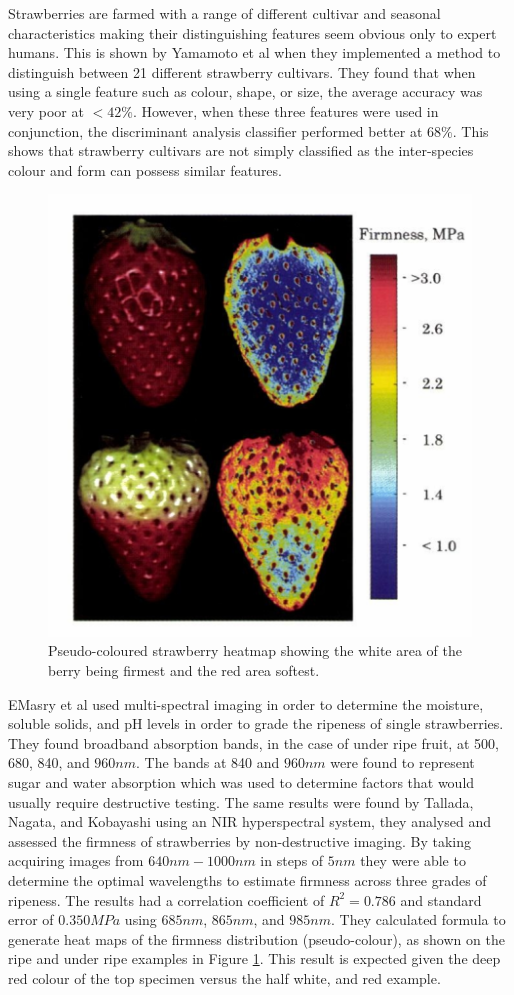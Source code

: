 \documentclass[fleqn,twoside,12pt]{report}
\begin{document}
Strawberries are farmed with a range of different cultivar and seasonal characteristics making their distinguishing features seem obvious only to expert humans. This is shown by Yamamoto et al \cite{yamamoto} when they implemented a method to distinguish between 21 different strawberry cultivars. They found that when using a single feature such as colour, shape, or size, the average accuracy was very poor at $<42\%$. However, when these three features were used in conjunction, the discriminant analysis classifier performed better at $68\%$. This shows that strawberry cultivars are not simply classified as the inter-species colour and form can possess similar features. 


\begin{figure}[h]
	\centering
	\includegraphics[width=0.5\linewidth]{multispec_strawberry.png}
	\caption{Pseudo-coloured strawberry heatmap showing the white area of the berry being firmest and the red area softest.}
	\label{fig:multispec_strawberry}
\end{figure}%

EMasry et al \cite{elmasry2} used multi-spectral imaging in order to determine the moisture, soluble solids, and pH levels in order to grade the ripeness of single strawberries. They found broadband absorption bands, in the case of under ripe fruit, at 500, 680, 840, and $960nm$. The bands at 840 and $960nm$ were found to represent sugar and water absorption which was used to determine factors that would usually require destructive testing. The same results were found by Tallada, Nagata, and Kobayashi \cite{tallada} using an NIR hyperspectral system, they analysed and assessed the firmness of strawberries by non-destructive imaging. By taking acquiring images from $640nm-1000nm$ in steps of $5nm$ they were able to determine the optimal wavelengths to estimate firmness across three grades of ripeness. The results had a correlation coefficient of $R^2=0.786$ and standard error of $0.350MPa$ using $685nm$, $865nm$, and $985nm$. They calculated formula to generate heat maps of the firmness distribution (pseudo-colour), as shown on the ripe and under ripe examples in Figure \ref{fig:multispec_strawberry}. This result is expected given the deep red colour of the top specimen versus the half white, and red example.
\end{document}
